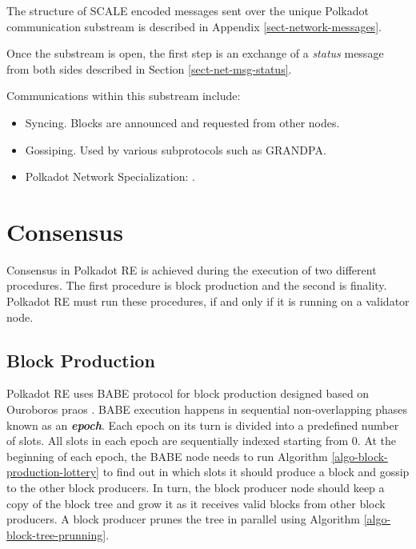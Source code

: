 \documentclass{book}
\newcommand{\tmem}[1]{{\em #1\/}}
\newcommand{\tmstrong}[1]{\textbf{#1}}
\begin{document}
The structure of SCALE encoded messages sent over the unique Polkadot
communication substream is described in Appendix \ref{sect-network-messages}.

Once the substream is open, the first step is an exchange of a {\tmem{status}}
message from both sides described in Section \ref{sect-net-msg-status}.

Communications within this substream include:
\begin{itemize}
  \item Syncing. Blocks are announced and requested from other nodes.
  
  \item Gossiping. Used by various subprotocols such as GRANDPA.
  
  \item Polkadot Network Specialization: {}.
\end{itemize}
\chapter{Consensus}\label{chap-consensu}

Consensus in Polkadot RE is achieved during the execution of two different
procedures. The first procedure is block production and the second is
finality. Polkadot RE must run these procedures, if and only if it is running
on a validator node.

\section{Block Production}\label{sect-babe}\label{sect-block-production}

Polkadot RE uses BABE protocol {\cite{w3f_research_group_blind_2019}} for
block production designed based on Ouroboros praos
{\cite{david_ouroboros_2018}}. BABE execution happens in sequential
non-overlapping phases known as an {\tmstrong{{\tmem{epoch}}}}. Each epoch on
its turn is divided into a predefined number of slots. All slots in each epoch
are sequentially indexed starting from 0. At the beginning of each epoch, the
BABE node needs to run Algorithm \ref{algo-block-production-lottery} to find
out in which slots it should produce a block and gossip to the other block
producers. In turn, the block producer node should keep a copy of the block
tree and grow it as it receives valid blocks from other block producers. A
block producer prunes the tree in parallel using Algorithm
\ref{algo-block-tree-prunning}.
\end{document}
